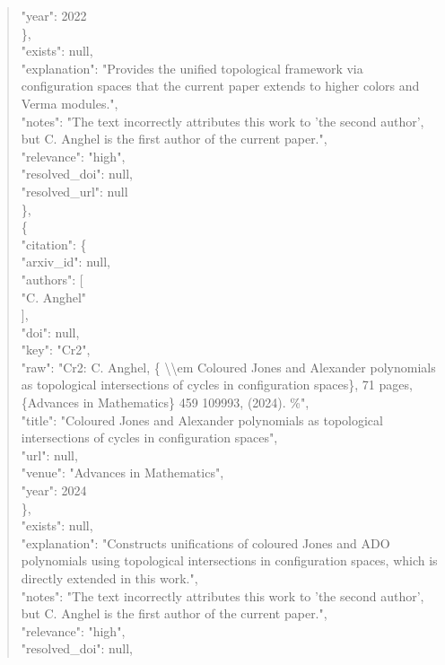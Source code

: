 \documentclass[11pt]{article}
\begin{document}
\begin{quote}
        "year": 2022\\
      \},\\
      "exists": null,\\
      "explanation": "Provides the unified topological framework via configuration spaces that the current paper extends to higher colors and Verma modules.",\\
      "notes": "The text incorrectly attributes this work to 'the second author', but C. Anghel is the first author of the current paper.",\\
      "relevance": "high",\\
      "resolved\_doi": null,\\
      "resolved\_url": null\\
    \},\\
    \{\\
      "citation": \{\\
        "arxiv\_id": null,\\
        "authors": [\\
          "C. Anghel"\\
        ],\\
        "doi": null,\\
        "key": "Cr2",\\
        "raw": "Cr2: C. Anghel, \{ \textbackslash{}\textbackslash{}em Coloured Jones and Alexander polynomials as topological intersections of cycles in configuration spaces\}, 71 pages, \{Advances in Mathematics\} 459 109993, (2024). \%",\\
        "title": "Coloured Jones and Alexander polynomials as topological intersections of cycles in configuration spaces",\\
        "url": null,\\
        "venue": "Advances in Mathematics",\\
        "year": 2024\\
      \},\\
      "exists": null,\\
      "explanation": "Constructs unifications of coloured Jones and ADO polynomials using topological intersections in configuration spaces, which is directly extended in this work.",\\
      "notes": "The text incorrectly attributes this work to 'the second author', but C. Anghel is the first author of the current paper.",\\
      "relevance": "high",\\
      "resolved\_doi": null,\\

\end{quote}
\end{document}
